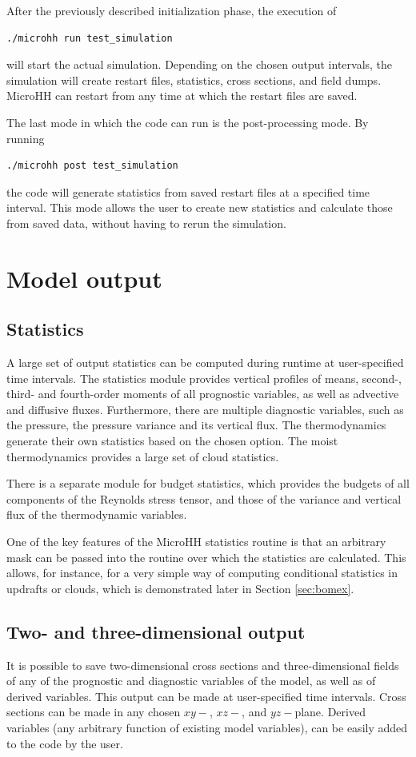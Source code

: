 \documentclass[gmd,manuscript]{copernicus}
\begin{document}
After the previously described initialization phase, the execution of
\begin{verbatim}
./microhh run test_simulation
\end{verbatim}
will start the actual simulation. Depending on the chosen output intervals, the simulation will create restart files, statistics, cross sections, and field dumps. MicroHH can restart from any time at which the restart files are saved.

The last mode in which the code can run is the post-processing mode. By running 
\begin{verbatim}
./microhh post test_simulation
\end{verbatim}
the code will generate statistics from saved restart files at a specified time interval. This mode allows the user to create new statistics and calculate those from saved data, without having to rerun the simulation.

\section{Model output}\label{sec:output}
\subsection{Statistics}
A large set of output statistics can be computed during runtime at user-specified time intervals. The statistics module provides vertical profiles of means, second-, third- and fourth-order moments of all prognostic variables, as well as advective and diffusive fluxes. Furthermore, there are multiple diagnostic variables, such as the pressure, the pressure variance and its vertical flux. The thermodynamics generate their own statistics based on the chosen option. The moist thermodynamics provides a large set of cloud statistics.

There is a separate module for budget statistics, which provides the budgets of all components of the Reynolds stress tensor, and those of the variance and vertical flux of the thermodynamic variables.

One of the key features of the MicroHH statistics routine is that an arbitrary mask can be passed into the routine over which the statistics are calculated. This allows, for instance, for a very simple way of computing conditional statistics in updrafts or clouds, which is demonstrated later in Section \ref{sec:bomex}.

\subsection{Two- and three-dimensional output}
It is possible to save two-dimensional cross sections and three-dimensional fields of any of the prognostic and diagnostic variables of the model, as well as of derived variables. This output can be made at user-specified time intervals. Cross sections can be made in any chosen $xy-$, $xz-$, and $yz-$plane. Derived variables (any arbitrary function of existing model variables), can be easily added to the code by the user.
\end{document}
